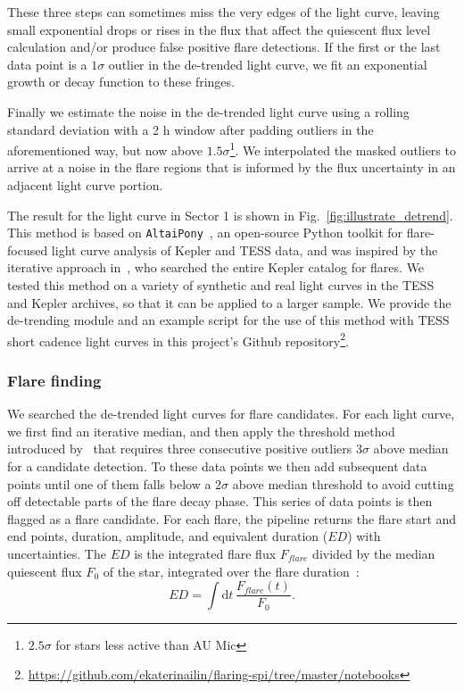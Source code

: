 \documentclass[fleqn,usenatbib]{mnras}%
\begin{document}
These three steps can sometimes miss the very edges of the light curve, leaving small exponential drops or rises in the flux that affect the quiescent flux level calculation and/or produce false positive flare detections. If the first or the last data point is a $1\sigma$ outlier in the de-trended light curve, we fit an exponential growth or decay function to these fringes.

Finally we estimate the noise in the de-trended light curve using a rolling standard deviation with a 2 h window after padding outliers in the aforementioned way, but now above $1.5 \sigma$\footnote{$2.5 \sigma$ for stars less active than AU Mic}. We interpolated the masked outliers to arrive at a noise in the flare regions that is informed by the flux uncertainty in an adjacent light curve portion.

The result for the light curve in Sector 1 is shown in Fig.~\ref{fig:illustrate_detrend}. This method is based on \texttt{AltaiPony}~\citep{ilin2021altaipony}, an open-source Python toolkit for flare-focused light curve analysis of Kepler and TESS data, and was inspired by the iterative approach in~\citet{davenport2016}, who searched the entire Kepler catalog for flares. We tested this method on a variety of synthetic and real light curves in the TESS and Kepler archives, so that it can be applied to a larger sample. We provide the de-trending module and an example script for the use of this method with TESS short cadence light curves in this project's Github repository\footnote{\url{https://github.com/ekaterinailin/flaring-spi/tree/master/notebooks}}.

\subsubsection{Flare finding}
\label{sec:flarefind}
We searched the de-trended light curves for flare candidates. For each light curve, we first find an iterative median, and then apply the threshold method introduced by~\citep{chang2015} that requires three consecutive positive outliers $3 \sigma$ above median for a candidate detection. To these data points we then add subsequent data points until one of them falls below a $2 \sigma$ above median threshold to avoid cutting off detectable parts of the flare decay phase. This series of data points is then flagged as a flare candidate. For each flare, the pipeline returns the flare start and end points, duration, amplitude, and equivalent duration ($ED$) with uncertainties. The $ED$ is the integrated flare flux $F_{flare}$ divided by the median quiescent flux $F_0$ of the star, integrated over the flare duration~\citep{gershberg1972}:
\begin{equation}
\label{eq:ED}
ED=\displaystyle \int \mathrm dt\, \frac{F_{flare}(t)}{F_0}.
\end{equation}
\end{document}
